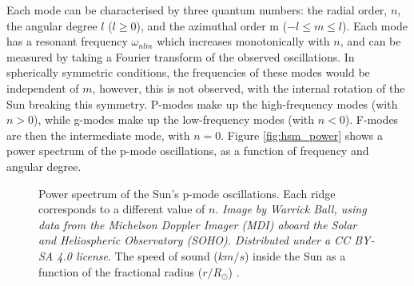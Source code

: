 \documentclass[11pt,a4paper,onecolumn]{report}
\begin{document}
Each mode can be characterised by three quantum numbers: the radial order,
\(n\), the angular degree \(l\) (\(l \geq 0\)), and the azimuthal order m (\(-l
\leq m \leq l\)). Each mode has a resonant frequency \(\omega_{nlm}\) which
increases monotonically with \(n\), and can be measured by taking a Fourier
transform of the observed oscillations. In spherically symmetric conditions, the
frequencies of these modes would be independent of \(m\), however, this is not
observed, with the internal rotation of the Sun breaking this symmetry. P-modes
make up the high-frequency modes (with \(n>0\)), while g-modes make up the
low-frequency modes (with \(n<0\)). F-modes are then the intermediate mode, with
\(n=0\). Figure \ref{fig:hsm_power} shows a power spectrum of the p-mode
oscillations, as a function of frequency and angular degree. \\

\begin{figure}[t]
  \centering
   \caption{ Power spectrum of the Sun's p-mode
  oscillations. Each ridge corresponds to a different value of \(n\).
  \textit{Image by Warrick Ball, using data from the Michelson Doppler Imager
  (MDI) aboard the Solar and Heliospheric Observatory (SOHO). Distributed under
  a CC BY-SA 4.0 license}.  The speed of sound
  (\(\si{km\per s}\)) inside the Sun as a function of the fractional radius
  (\(\si{r \per R_\odot}\)) \citep{bahcall_solar_2000}.}

\end{figure}
\end{document}
